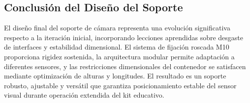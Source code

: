 \subsection{Conclusión del Diseño del Soporte}

El diseño final del soporte de cámara representa una evolución significativa respecto a la iteración inicial, incorporando lecciones aprendidas sobre desgaste de interfaces y estabilidad dimensional. El sistema de fijación roscada M10 proporciona rigidez sostenida, la arquitectura modular permite adaptación a diferentes sensores, y las restricciones dimensionales del contenedor se satisfacen mediante optimización de alturas y longitudes. El resultado es un soporte robusto, ajustable y versátil que garantiza posicionamiento estable del sensor visual durante operación extendida del kit educativo.
